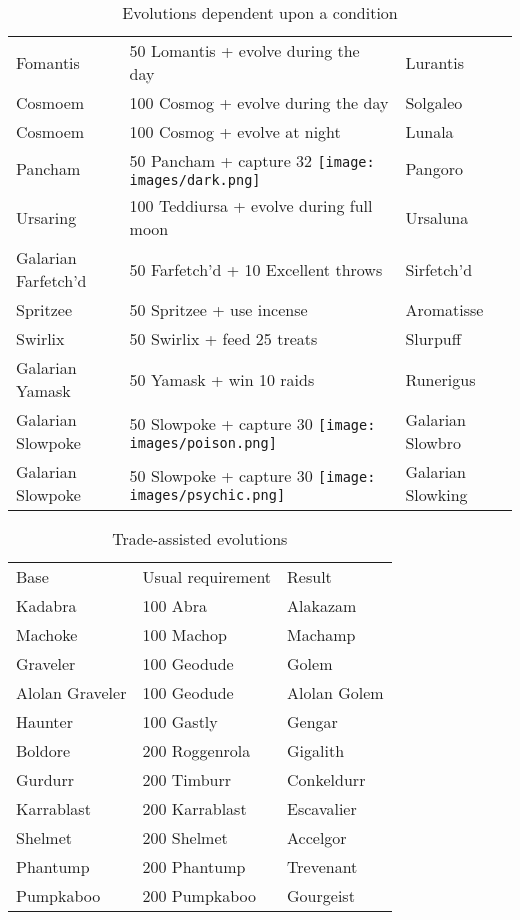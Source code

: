 \begin{table}
\begin{tabular}{lll}
  Fomantis & 50 Lomantis + evolve during the day & Lurantis\\
  Cosmoem & 100 Cosmog + evolve during the day & Solgaleo\\
  Cosmoem & 100 Cosmog + evolve at night & Lunala\\
  Pancham	& 50 Pancham + capture 32 \texttt{[image: images/dark.png]} & Pangoro\\
  Ursaring & 100 Teddiursa + evolve during full moon & Ursaluna\\
  Galarian Farfetch'd & 50 Farfetch'd + 10 Excellent throws & Sirfetch'd \\
  Spritzee & 50 Spritzee + use incense & Aromatisse\\
  Swirlix & 50 Swirlix + feed 25 treats & Slurpuff\\
  Galarian Yamask & 50 Yamask + win 10 raids & Runerigus\\
  Galarian Slowpoke & 50 Slowpoke + capture 30 \texttt{[image: images/poison.png]} & Galarian Slowbro\\
  Galarian Slowpoke & 50 Slowpoke + capture 30 \texttt{[image: images/psychic.png]} & Galarian Slowking\\
\end{tabular}
\caption{Evolutions dependent upon a condition\label{table:condevolutions}}
\end{table}
\begin{table}
\footnotesize
\centering
\begin{tabular}{lll}
  Base & Usual requirement & Result \\
\Midrule
Kadabra & 100 Abra & Alakazam\\
Machoke & 100 Machop & Machamp\\
  Graveler & 100 Geodude & Golem\\
  Alolan Graveler & 100 Geodude & Alolan Golem\\
  Haunter & 100 Gastly & Gengar\\
  Boldore & 200 Roggenrola & Gigalith\\
  Gurdurr & 200 Timburr & Conkeldurr\\
  Karrablast & 200 Karrablast & Escavalier\\
  Shelmet & 200 Shelmet & Accelgor\\
  Phantump & 200 Phantump & Trevenant\\
  Pumpkaboo & 200 Pumpkaboo & Gourgeist\\
\end{tabular}
  \caption{Trade-assisted evolutions\label{table:tradeevolution}}
\end{table}
